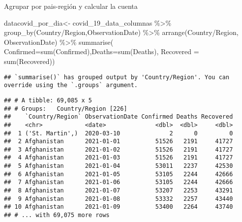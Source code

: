 \documentclass[
]{book}
\newenvironment{Shaded}{\begin{snugshade}}{\end{snugshade}}
\newcommand{\AttributeTok}[1]{\textcolor[rgb]{0.77,0.63,0.00}{#1}}
\newcommand{\FunctionTok}[1]{\textcolor[rgb]{0.00,0.00,0.00}{#1}}
\newcommand{\NormalTok}[1]{#1}
\newcommand{\OtherTok}[1]{\textcolor[rgb]{0.56,0.35,0.01}{#1}}
\newcommand{\SpecialCharTok}[1]{\textcolor[rgb]{0.00,0.00,0.00}{#1}}
\newcommand{\StringTok}[1]{\textcolor[rgb]{0.31,0.60,0.02}{#1}}
\begin{document}
Agrupar por pais-región y calcular la cuenta

\begin{Shaded}
\begin{Highlighting}[]
\NormalTok{datacovid\_por\_dia}\OtherTok{\textless{}{-}}\NormalTok{ covid\_19\_data\_columnas }\SpecialCharTok{\%\textgreater{}\%} \FunctionTok{group\_by}\NormalTok{(}\StringTok{\textasciigrave{}}\AttributeTok{Country/Region}\StringTok{\textasciigrave{}}\NormalTok{,ObservationDate) }\SpecialCharTok{\%\textgreater{}\%} \FunctionTok{arrange}\NormalTok{(}\StringTok{\textasciigrave{}}\AttributeTok{Country/Region}\StringTok{\textasciigrave{}}\NormalTok{, ObservationDate)  }\SpecialCharTok{\%\textgreater{}\%} \FunctionTok{summarise}\NormalTok{(   }\AttributeTok{Confirmed=}\FunctionTok{sum}\NormalTok{(Confirmed),}\AttributeTok{Deaths=}\FunctionTok{sum}\NormalTok{(Deaths), }\AttributeTok{Recovered =} \FunctionTok{sum}\NormalTok{(Recovered))}
\end{Highlighting}
\end{Shaded}

\begin{verbatim}
## `summarise()` has grouped output by 'Country/Region'. You can override using the `.groups` argument.
\end{verbatim}

\begin{Shaded}
\end{Shaded}

\begin{verbatim}
## # A tibble: 69,085 x 5
## # Groups:   Country/Region [226]
##    `Country/Region` ObservationDate Confirmed Deaths Recovered
##    <chr>            <date>              <dbl>  <dbl>     <dbl>
##  1 ('St. Martin',)  2020-03-10              2      0         0
##  2 Afghanistan      2021-01-01          51526   2191     41727
##  3 Afghanistan      2021-01-02          51526   2191     41727
##  4 Afghanistan      2021-01-03          51526   2191     41727
##  5 Afghanistan      2021-01-04          53011   2237     42530
##  6 Afghanistan      2021-01-05          53105   2244     42666
##  7 Afghanistan      2021-01-06          53105   2244     42666
##  8 Afghanistan      2021-01-07          53207   2253     43291
##  9 Afghanistan      2021-01-08          53332   2257     43440
## 10 Afghanistan      2021-01-09          53400   2264     43740
## # ... with 69,075 more rows
\end{verbatim}
\end{document}

